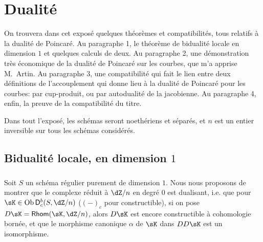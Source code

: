 
\chapter{Dualité}\label{V}




















On trouvera dans cet exposé quelques théorèmes et compatibilités, tous 
relatifs à la dualité de Poincaré. Au paragraphe 1, le théorème de 
bidualité locale en dimension $1$ \cite[I.5.1]{sga5} et quelques calculs de 
deux. Au paragraphe 2, une démonstration très économique de la dualité 
de Poincaré sur les courbes, que m'a apprise M.\ Artin. Au paragraphe 3, une 
compatibilité qui fait le lien entre deux définitions de l'accouplement qui 
donne lieu à la dualité de Poincaré pour les courbes: par cup-produit, ou 
par autodualité de la jacobienne. Au paragraphe 4, enfin, la preuve de la 
compatibilité du titre. 

Dans tout l'exposé, les schémas seront noethériens et séparés, et $n$ 
est un entier inversible sur tous les schémas considérés. 










\section{Bidualité locale, en dimension \texorpdfstring{$1$}{1}}\label{V:1}





\subsection{}\label{V:1-1}

Soit $S$ un schéma régulier purement de dimension $1$. Nous nous proposons 
de montrer que le complexe réduit à $\dZ/n$ en degré $0$ est 
dualisant, i.e. que pour $\sK\in \ob\D_c^b(S,\dZ/n)$ ($(-)_c$ pour 
constructible), si on pose $D\sK=\rHom(\sK,\dZ/n)$, alors $D\sK$ est encore 
constructible à cohomologie bornée, et que le morphisme canonique $\alpha$ 
de $\sK$ dans $D D\sK$ est un isomorphisme. 

